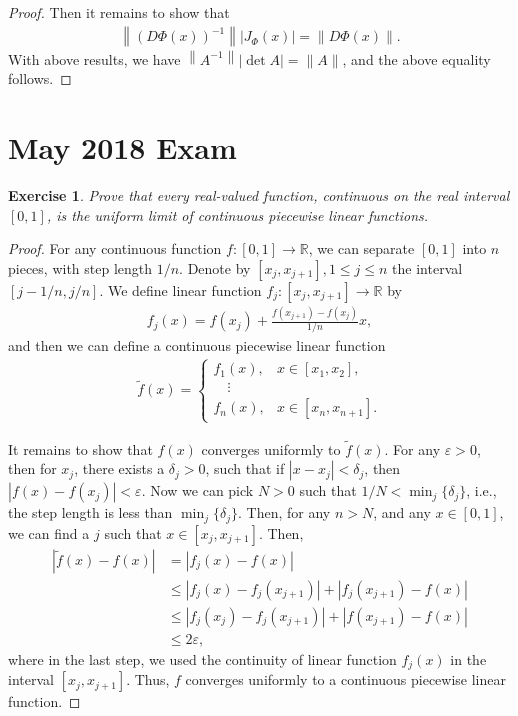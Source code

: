 \documentclass[11pt]{article}
\newtheorem{exercise}{Exercise}[section]
\theoremstyle{definition}
\numberwithin{equation}{subsection}
\begin{document}
\begin{proof}
Then it remains to show that 
\begin{align*}
    \left\|\left(D\Phi(x)\right)^{-1} \right\| \left|J_\Phi(x)\right| = \left\|D\Phi(x) \right\|.
\end{align*}
With above results, we have $\left\|A^{-1}\right\| |\det A|= \|A\|$, and the above equality follows.
\end{proof}


\newpage

\section{May 2018 Exam}


\begin{exercise}
Prove that every real-valued function, continuous on the real interval $[0,1]$, is the uniform limit of continuous piecewise linear functions.
\end{exercise}
\begin{proof}
For any continuous function $f:[0,1] \to \mathbb{R}$, we can separate $[0,1]$ into $n$ pieces, with step length $1/n$. Denote by $[x_j, x_{j+1}], 1 \leq j \leq n$ the interval $\left[j-1/n, j/n\right]$. We define linear function $f_j: [x_j, x_{j+1}] \to \mathbb{R}$ by
\begin{align*}
    f_j(x) = f(x_j) + \frac{f(x_{j+1}) - f(x_j)}{1/n} x,
\end{align*}
and then we can define a continuous piecewise linear function
\begin{align*}
    \widetilde{f}(x) = \begin{cases}
        f_1(x), & x \in [x_1, x_2], \\
        \quad \vdots \\
        f_n(x), & x \in [x_n, x_{n+1}].
    \end{cases}
\end{align*}

It remains to show that $f(x)$ converges uniformly to $\widetilde{f}(x)$. For any $\varepsilon > 0$, then for $x_j$, there exists a $\delta_j > 0$, such that if $|x - x_j| < \delta_j$, then $|f(x) - f(x_j)| < \varepsilon$. Now we can pick $N > 0$ such that $1/N < \min_{j}\{\delta_j\}$, i.e., the step length is less than $\min_{j}\{\delta_j\}$. Then, for any $n > N$, and any $x \in [0,1]$, we can find a $j$ such that $x \in [x_j, x_{j+1}]$. Then,
\begin{align*}
    \left|\widetilde{f}(x) - f(x)\right| & = \left|f_j(x) - f(x)\right| \\
    & \leq \left|f_j(x) -  f_j(x_{j+1})\right| + \left|f_j(x_{j+1}) - f(x)\right| \\
    & \leq \left|f_j(x_j) -  f_j(x_{j+1})\right| + \left|f(x_{j+1}) - f(x)\right| \\
    & \leq 2 \varepsilon,
\end{align*}
where in the last step, we used the continuity of linear function $f_j(x)$ in the interval $[x_j, x_{j+1}]$. Thus, $f$ converges uniformly to a continuous piecewise linear function.
\end{proof}
\end{document}
